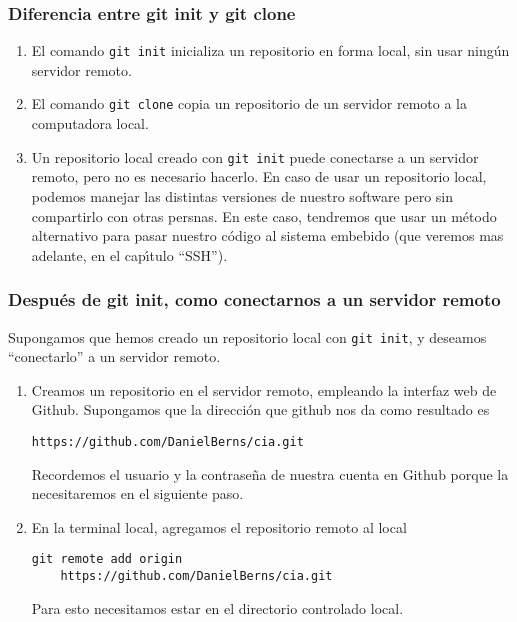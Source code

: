 \documentclass{beamer}
\begin{document}
\begin{frame}[fragile]
\frametitle{Diferencia entre git init y git clone}

\begin{enumerate}
\item El comando \verb|git init| inicializa un repositorio en forma local, sin usar ning\'{u}n servidor remoto.

\item El comando \verb|git clone| copia un repositorio de un servidor remoto a la computadora local.

\item Un repositorio local creado con \verb|git init| puede conectarse a un servidor remoto, pero no es necesario hacerlo.
En caso de usar un repositorio local, podemos manejar las distintas versiones de nuestro software pero sin compartirlo con otras persnas. En este caso, tendremos que usar un m\'{e}todo alternativo para pasar nuestro c\'{o}digo al sistema embebido (que veremos mas adelante, en el cap\'{\i}tulo ``SSH'').

\end{enumerate}

\end{frame}

\begin{frame}[fragile]
\frametitle{Despu\'{e}s de git init, como conectarnos a un servidor remoto}

Supongamos que hemos creado un repositorio local con \verb|git init|, y deseamos ``conectarlo'' a un servidor remoto.
\begin{enumerate}
\item Creamos un repositorio en el servidor remoto, empleando la interfaz web de Github. Supongamos que la direcci\'{o}n que github nos da como resultado es
\begin{verbatim}
https://github.com/DanielBerns/cia.git
\end{verbatim}
Recordemos el usuario y la contrase\~{n}a de nuestra cuenta en Github porque la necesitaremos en el siguiente paso.

\item En la terminal local, agregamos el repositorio remoto al local
\begin{verbatim}
git remote add origin 
    https://github.com/DanielBerns/cia.git
\end{verbatim}
Para esto necesitamos estar en el directorio controlado local.

\end{enumerate}
\end{frame}
\end{document}
